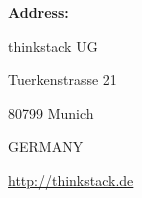 \documentclass[fleqn,10pt]{SelfArx} %
\begin{document}
\textbf{Address:}

thinkstack UG

Tuerkenstrasse 21

80799 Munich

GERMANY

\url{http://thinkstack.de}


%

\end{document}
